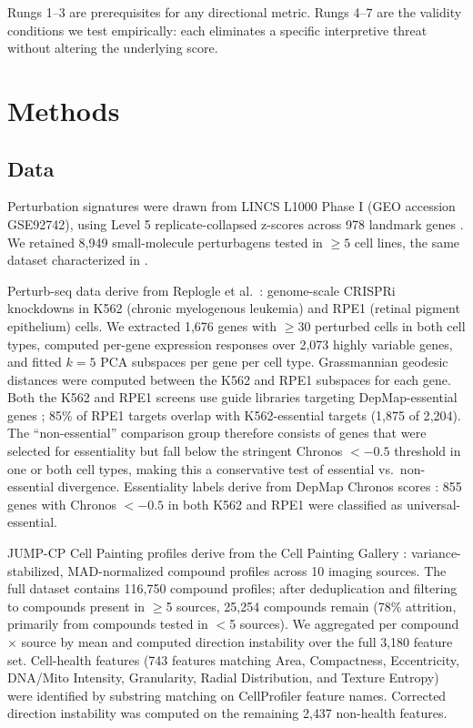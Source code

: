 \documentclass{article}
\begin{document}
Rungs 1--3 are prerequisites for any directional metric. Rungs 4--7 are the
validity conditions we test empirically: each eliminates a specific
interpretive threat without altering the underlying score.

\section{Methods}

\subsection{Data}

Perturbation signatures were drawn from LINCS L1000 Phase I (GEO accession
GSE92742), using Level 5 replicate-collapsed z-scores across 978 landmark
genes \citep{subramanian2017next}. We retained 8{,}949 small-molecule
perturbagens tested in $\geq5$ cell lines, the same dataset characterized in
\citet{tower2026bracket}.

Perturb-seq data derive from Replogle et al.\
\citep{replogle2022mapping}: genome-scale CRISPRi knockdowns in K562
(chronic myelogenous leukemia) and RPE1 (retinal pigment epithelium)
cells. We extracted 1{,}676 genes with $\geq$30 perturbed cells in both
cell types, computed per-gene expression responses over 2{,}073 highly
variable genes, and fitted $k = 5$ PCA subspaces per gene per cell type.
Grassmannian geodesic distances were computed between the K562 and RPE1
subspaces for each gene. Both the K562 and RPE1 screens use guide libraries
targeting DepMap-essential genes \citep{replogle2022mapping}; 85\% of RPE1
targets overlap with K562-essential targets (1{,}875 of 2{,}204). The
``non-essential'' comparison group therefore consists of genes that were
selected for essentiality but fall below the stringent Chronos $< -0.5$
threshold in one or both cell types, making this a conservative test of
essential vs.\ non-essential divergence. Essentiality labels derive from
DepMap Chronos scores \citep{dempster2021chronos}: 855 genes with Chronos
$< -0.5$ in both K562 and RPE1 were classified as universal-essential.

JUMP-CP Cell Painting profiles derive from the Cell Painting Gallery
\citep{chandrasekaran2023jump}: variance-stabilized, MAD-normalized
compound profiles across 10 imaging sources. The full dataset contains
116{,}750 compound profiles; after deduplication and filtering to compounds
present in $\geq$5 sources, 25{,}254 compounds remain (78\% attrition,
primarily from compounds tested in $<$5 sources). We aggregated per
compound $\times$ source by mean and computed direction instability over
the full 3{,}180 feature set. Cell-health features (743 features matching Area, Compactness,
Eccentricity, DNA/Mito Intensity, Granularity, Radial Distribution, and
Texture Entropy) were identified by substring matching on CellProfiler
feature names. Corrected direction instability was computed on the remaining
2{,}437 non-health features.
\end{document}
